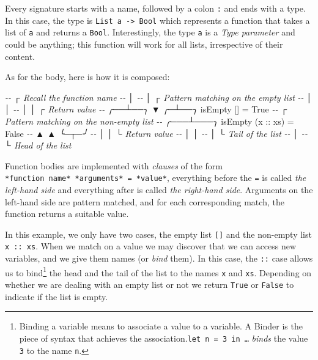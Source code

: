 \documentclass[
]{article}
\newenvironment{Shaded}{}{}
\newcommand{\CommentTok}[1]{\textcolor[rgb]{0.38,0.63,0.69}{\textit{#1}}}
\newcommand{\DataTypeTok}[1]{\textcolor[rgb]{0.56,0.13,0.00}{#1}}
\newcommand{\NormalTok}[1]{#1}
\newcommand{\OtherTok}[1]{\textcolor[rgb]{0.00,0.44,0.13}{#1}}
\begin{document}
Every signature starts with a name, followed by a colon \texttt{:} and
ends with a type. In this case, the type is
\texttt{List\ a\ -\textgreater{}\ Bool} which represents a function that
takes a list of \texttt{a} and returns a \texttt{Bool}. Interestingly,
the type \texttt{a} is a \emph{Type parameter} and could be anything;
this function will work for all lists, irrespective of their content.

As for the body, here is how it is composed:

\begin{Shaded}
\begin{Highlighting}[]
\CommentTok{{-}{-}    ┌ Recall the function name}
\CommentTok{{-}{-}    │   }
\CommentTok{{-}{-}    │     ┌ Pattern matching on the empty list}
\CommentTok{{-}{-}    │     │   }
\CommentTok{{-}{-}    │     │    ┌ Return value}
\CommentTok{{-}{-} ╭──┴──╮  ▼  ╭─┴──╮}
\NormalTok{   isEmpty [] }\OtherTok{=} \DataTypeTok{True}
\CommentTok{{-}{-}             ┌ Pattern matching on the non{-}empty list}
\CommentTok{{-}{-}         ╭───┴───╮}
\NormalTok{   isEmpty (}\OtherTok{x ::}\NormalTok{ xs) }\OtherTok{=} \DataTypeTok{False}
\CommentTok{{-}{-}          ▲    ▲     ╰─┬─╯}
\CommentTok{{-}{-}          │    │       └ Return value}
\CommentTok{{-}{-}          │    │}
\CommentTok{{-}{-}          │    └ Tail of the list}
\CommentTok{{-}{-}          │}
\CommentTok{{-}{-}          └ Head of the list}
\end{Highlighting}
\end{Shaded}

Function bodies are implemented with \emph{clauses} of the form
\texttt{*function\ name*\ *arguments*\ =\ *value*}, everything before
the \texttt{=} is called \emph{the left-hand side} and everything after
is called \emph{the right-hand side}. Arguments on the left-hand side
are pattern matched, and for each corresponding match, the function
returns a suitable value.

In this example, we only have two cases, the empty list \texttt{{[}{]}}
and the non-empty list \texttt{x\ ::\ xs}. When we match on a value we
may discover that we can access new variables, and we give them names
(or \emph{bind} them). In this case, the \texttt{::} case allows us to
bind\footnote{Binding a variable means to associate a value to a
  variable. A Binder is the piece of syntax that achieves the
  association.\texttt{let\ n\ =\ 3\ in\ \ldots{}} \emph{binds} the value
  \texttt{3} to the name \texttt{n}.} the head and the tail of the list
to the names \texttt{x} and \texttt{xs}. Depending on whether we are
dealing with an empty list or not we return \texttt{True} or
\texttt{False} to indicate if the list is empty.
\end{document}
